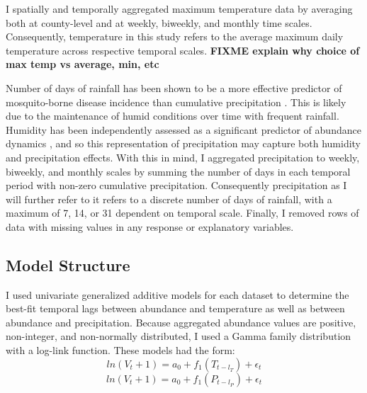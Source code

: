 I spatially and temporally aggregated maximum temperature data by averaging both at county-level and at weekly, biweekly, and monthly time scales. Consequently, temperature in this study refers to the average maximum daily temperature across respective temporal scales.  \textbf{FIXME explain why choice of max temp vs average, min, etc}

Number of days of rainfall has been shown to be a more effective predictor of mosquito-borne disease incidence than cumulative precipitation \citep{Xu2017}. This is likely due to the maintenance of humid conditions over time with frequent rainfall. Humidity has been independently assessed as a significant predictor of abundance dynamics \citep{Trawinski2008}, and so this representation of precipitation may capture both humidity and precipitation effects. With this in mind, I aggregated precipitation to weekly, biweekly, and monthly scales by summing the number of days in each temporal period with non-zero cumulative precipitation. Consequently precipitation as I will further refer to it refers to a discrete number of days of rainfall, with a maximum of 7, 14, or 31 dependent on temporal scale. Finally, I removed rows of data with missing values in any response or explanatory variables. 


\subsection{Model Structure}

I used univariate generalized additive models for each dataset to determine the best-fit temporal lags between abundance and temperature as well as between abundance and precipitation. Because aggregated abundance values are positive, non-integer, and non-normally distributed, I used a Gamma family distribution with a log-link function. These models had the form:
\begin{equation}
	ln(V_t + 1) = a_0 + f_1(T_{t-l_T}) + \epsilon_t
	\label{eq: univariateT}
\end{equation}
\begin{equation}
	ln(V_t + 1) = a_0 + f_1(P_{t-l_P}) + \epsilon_t
	\label{eq: univariateP}
\end{equation}


